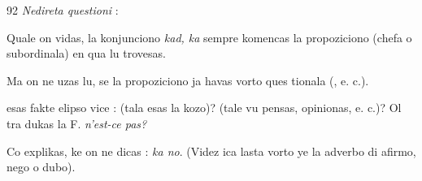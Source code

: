 \begin{VUpage}[96]{92}
\textit{Nedireta questioni} : \cc
{}

Quale on vidas, la konjunciono \textit{kad, ka} sempre komencas\nl
la propoziciono (chefa o subordinala) en qua lu trovesas.

Ma on ne uzas lu, se la propoziciono ja havas vorto ques\cc
tionala (, e. c.).

 esas fakte elipso vice :  (tala esas\nl
la kozo)?  (tale vu pensas, opinionas, e. c.)? Ol tra\cc
dukas la F. \textit{n'est-ce pas?}

Co explikas, ke on ne dicas : \textit{ka no}. (Videz ica lasta vorto\nl
ye la adverbo di afirmo, nego o dubo).
\end{VUpage}

